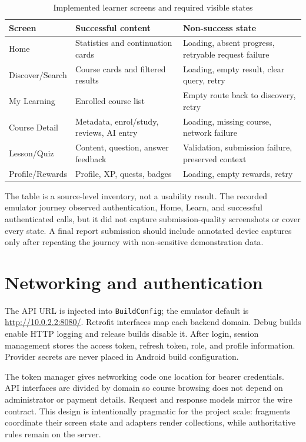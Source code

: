 \documentclass[12pt,a4paper,oneside]{report}
\begin{document}
\begin{table}[H]\centering
\caption{Implemented learner screens and required visible states}\label{tab:ui-states}
\begin{tabular}{P{0.24\textwidth}P{0.31\textwidth}P{0.34\textwidth}}\toprule
\textbf{Screen} & \textbf{Successful content} & \textbf{Non-success state}\\\midrule
Home & Statistics and continuation cards & Loading, absent progress, retryable request failure\\
Discover/Search & Course cards and filtered results & Loading, empty result, clear query, retry\\
My Learning & Enrolled course list & Empty route back to discovery, retry\\
Course Detail & Metadata, enrol/study, reviews, AI entry & Loading, missing course, network failure\\
Lesson/Quiz & Content, question, answer feedback & Validation, submission failure, preserved context\\
Profile/Rewards & Profile, XP, quests, badges & Loading, empty rewards, retry\\
\bottomrule\end{tabular}
\end{table}

The table is a source-level inventory, not a usability result. The recorded emulator
journey observed authentication, Home, Learn, and successful authenticated calls, but
it did not capture submission-quality screenshots or cover every state. A final report
submission should include annotated device captures only after repeating the journey
with non-sensitive demonstration data.

\section{Networking and authentication}
The API URL is injected into \texttt{BuildConfig}; the emulator default is
\url{http://10.0.2.2:8080/}. Retrofit interfaces map each backend domain.
Debug builds enable HTTP logging and release builds disable it. After login, session
management stores the access token, refresh token, role, and profile information.
Provider secrets are never placed in Android build configuration.

The token manager gives networking code one location for bearer credentials. API
interfaces are divided by domain so course browsing does not depend on administrator
or payment details. Request and response models mirror the wire contract. This design
is intentionally pragmatic for the project scale: fragments coordinate their screen
state and adapters render collections, while authoritative rules remain on the server.
\end{document}
